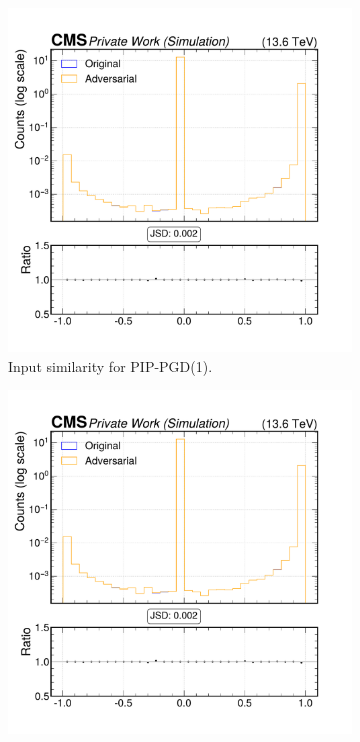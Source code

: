 \begin{figure}[htbp]
  \centering
  \begin{subfigure}[t]{0.32\textwidth}
    \includegraphics[width=\linewidth]{media/output/features/compare/combined_it_1/cmp_vtx_arr_sv_costhetasvpv.pdf}
    \caption*{Input similarity for PIP-PGD(1).}
  \end{subfigure}\hfill
  \begin{subfigure}[t]{0.32\textwidth}
    \includegraphics[width=\linewidth]{media/output/features/compare/combined_it_2/cmp_vtx_arr_sv_costhetasvpv.pdf}

\end{subfigure}
\end{figure}
